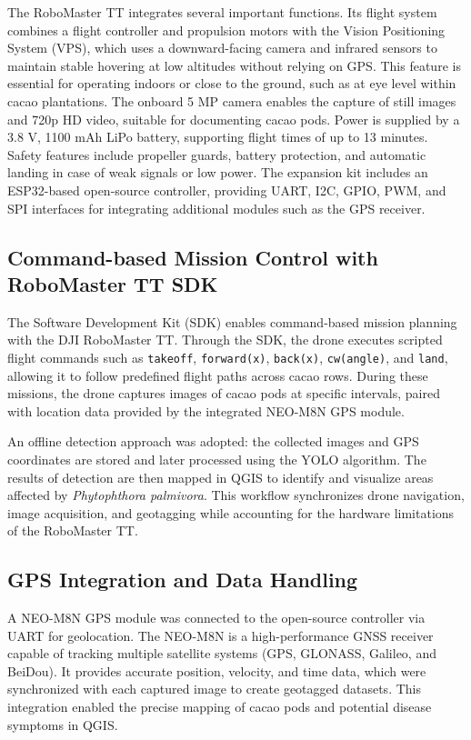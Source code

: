 The RoboMaster TT integrates several important functions. Its flight system combines a flight controller
and propulsion motors with the Vision Positioning System (VPS), which uses a downward-facing camera and
infrared sensors to maintain stable hovering at low altitudes without relying on GPS. This feature is
essential for operating indoors or close to the ground, such as at eye level within cacao plantations.
The onboard 5 MP camera enables the capture of still images and 720p HD video, suitable for documenting
cacao pods. Power is supplied by a 3.8 V, 1100 mAh LiPo battery, supporting flight times of up to
13 minutes. Safety features include propeller guards, battery protection, and automatic landing in case
of weak signals or low power. The expansion kit includes an ESP32-based open-source controller, providing
UART, I2C, GPIO, PWM, and SPI interfaces for integrating additional modules such as the GPS receiver.

\subsection*{Command-based Mission Control with RoboMaster TT SDK}
The Software Development Kit (SDK) enables command-based mission planning with the
DJI RoboMaster TT. Through the SDK, the drone executes scripted flight commands such as
\texttt{takeoff}, \texttt{forward(x)}, \texttt{back(x)}, \texttt{cw(angle)}, and \texttt{land},
allowing it to follow predefined flight paths across cacao rows. During these missions, the drone
captures images of cacao pods at specific intervals, paired with location data provided by the
integrated NEO-M8N GPS module.

An offline detection approach was adopted: the collected images and GPS coordinates are stored
and later processed using the YOLO algorithm. The results of detection are then mapped in QGIS
to identify and visualize areas affected by \textit{Phytophthora palmivora}. This workflow
synchronizes drone navigation, image acquisition, and geotagging while accounting for the
hardware limitations of the RoboMaster TT.

\subsection*{GPS Integration and Data Handling}
A NEO-M8N GPS module was connected to the open-source controller via UART for geolocation.
The NEO-M8N is a high-performance GNSS receiver capable of tracking multiple satellite systems
(GPS, GLONASS, Galileo, and BeiDou). It provides accurate position, velocity, and time data,
which were synchronized with each captured image to create geotagged datasets. This integration
enabled the precise mapping of cacao pods and potential disease symptoms in QGIS.

